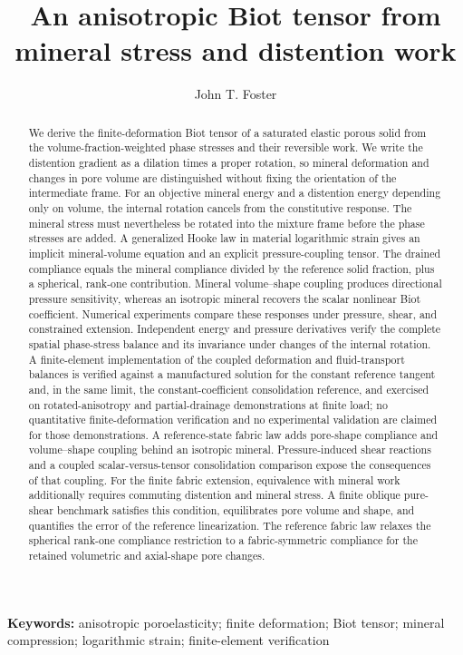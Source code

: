 \documentclass[11pt]{article}
\title{An anisotropic Biot tensor from mineral stress and distention work}
\author{John T. Foster}
\date{}
\begin{document}
\maketitle
\begin{abstract}
We derive the finite-deformation Biot tensor of a saturated elastic porous
solid from the volume-fraction-weighted phase stresses and their reversible
work. We write the distention gradient as a dilation times a proper rotation, so
mineral deformation and changes in pore volume are distinguished without
fixing the orientation of the intermediate frame. For an objective mineral
energy and a distention energy depending only on volume, the internal
rotation cancels from the constitutive response. The mineral stress must
nevertheless be rotated into the mixture frame before the phase stresses
are added. A generalized Hooke law in material logarithmic strain gives an
implicit mineral-volume equation and an explicit pressure-coupling tensor.
The drained compliance equals the mineral compliance divided by the
reference solid fraction, plus a spherical, rank-one contribution.
Mineral volume--shape coupling produces directional
pressure sensitivity, whereas an isotropic mineral recovers the scalar
nonlinear Biot coefficient. Numerical experiments compare these responses
under pressure, shear, and constrained extension. Independent energy and
pressure derivatives verify the complete spatial phase-stress balance and
its invariance under changes of the internal rotation. A finite-element
implementation of the coupled deformation and fluid-transport balances is
verified against a manufactured solution for the constant reference tangent
and, in the same limit, the constant-coefficient consolidation reference, and
exercised on rotated-anisotropy
and partial-drainage demonstrations at finite load; no quantitative
finite-deformation verification and no experimental validation are claimed for
those demonstrations. A reference-state fabric law adds pore-shape
compliance and volume--shape coupling behind an isotropic mineral.
Pressure-induced shear reactions and a coupled scalar-versus-tensor
consolidation comparison expose the consequences of that coupling.
For the finite fabric extension, equivalence with mineral work additionally
requires commuting distention and mineral stress. A finite oblique pure-shear
benchmark satisfies this condition, equilibrates pore volume and shape,
and quantifies the error of the reference linearization. The reference
fabric law relaxes the spherical rank-one compliance restriction to a
fabric-symmetric compliance for the retained volumetric and axial-shape
pore changes.
\end{abstract}
\noindent\textbf{Keywords:} anisotropic poroelasticity; finite deformation;
Biot tensor; mineral compression; logarithmic strain; finite-element
verification
\end{document}
